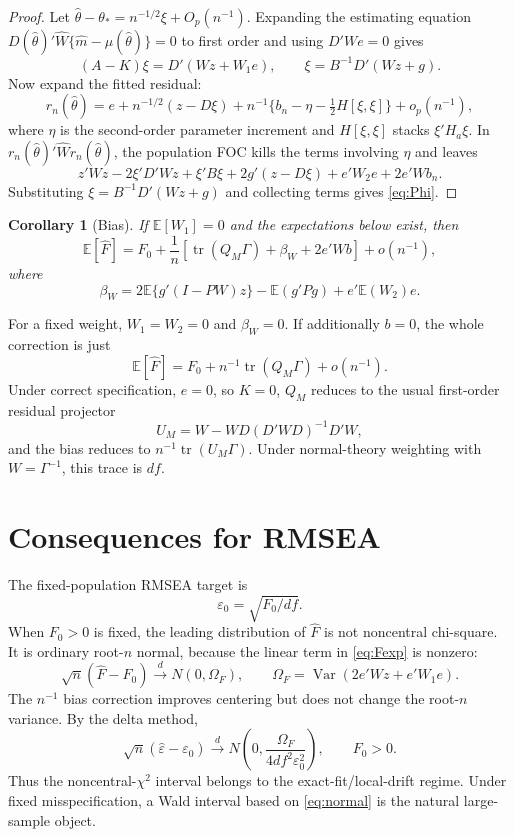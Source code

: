 \documentclass[11pt]{article}
\newcommand{\E}{\mathbb{E}}
\newcommand{\Var}{\operatorname{Var}}
\newcommand{\tr}{\operatorname{tr}}
\newcommand{\dto}{\xrightarrow{d}}
\theoremstyle{plain}
\newtheorem{corollary}{Corollary}
\theoremstyle{remark}
\begin{document}
\begin{proof}
Let $\hat\theta-\theta_\ast=n^{-1/2}\xi+O_p(n^{-1})$. Expanding the estimating
equation $D(\hat\theta)'\hat W\{\hat m-\mu(\hat\theta)\}=0$ to first order and
using $D'We=0$ gives
\[
  (A-K)\xi = D'(Wz+W_1e),
  \qquad
  \xi=B^{-1}D'(Wz+g).
\]
Now expand the fitted residual:
\[
  r_n(\hat\theta)
  =
  e+n^{-1/2}(z-D\xi)
  +n^{-1}\{b_n-\eta-\tfrac12 H[\xi,\xi]\}
  +o_p(n^{-1}),
\]
where $\eta$ is the second-order parameter increment and $H[\xi,\xi]$ stacks
$\xi'H_a\xi$. In $r_n(\hat\theta)'\hat W r_n(\hat\theta)$, the population FOC
kills the terms involving $\eta$ and leaves
\[
  z'Wz - 2\xi'D'Wz + \xi'B\xi
  + 2g'(z-D\xi)
  + e'W_2e
  + 2e'Wb_n .
\]
Substituting $\xi=B^{-1}D'(Wz+g)$ and collecting terms gives
\eqref{eq:Phi}.
\end{proof}

\begin{corollary}[Bias]\label{cor:bias}
If $\E[W_1]=0$ and the expectations below exist, then
\begin{equation}\label{eq:bias}
  \E[\hat F]
  =
  F_0
  + \frac{1}{n}
  \left[
    \tr(Q_M\Gamma)
    + \beta_W
    + 2e'Wb
  \right]
  + o(n^{-1}),
\end{equation}
where
\begin{equation}\label{eq:betaW}
  \beta_W
  =
  2\E\{g'(I-PW)z\}
  - \E(g'Pg)
  + e'\E(W_2)e .
\end{equation}
\end{corollary}

For a fixed weight, $W_1=W_2=0$ and $\beta_W=0$. If additionally $b=0$, the
whole correction is just
\[
  \E[\hat F]=F_0+n^{-1}\tr(Q_M\Gamma)+o(n^{-1}).
\]
Under correct specification, $e=0$, so $K=0$, $Q_M$ reduces to the
usual first-order residual projector
\[
  U_M = W-WD(D'WD)^{-1}D'W ,
\]
and the bias reduces to $n^{-1}\tr(U_M\Gamma)$. Under normal-theory weighting
with $W=\Gamma^{-1}$, this trace is $df$.

\section{Consequences for RMSEA}

The fixed-population RMSEA target is
\[
  \varepsilon_0 = \sqrt{F_0/df}.
\]
When $F_0>0$ is fixed, the leading distribution of $\hat F$ is not noncentral
chi-square. It is ordinary root-$n$ normal, because the linear term in
\eqref{eq:Fexp} is nonzero:
\begin{equation}\label{eq:normal}
  \sqrt n(\hat F-F_0)
  \dto
  N(0,\Omega_F),
  \qquad
  \Omega_F=\Var(2e'Wz+e'W_1e).
\end{equation}
The $n^{-1}$ bias correction improves centering but does not change the
root-$n$ variance. By the delta method,
\[
  \sqrt n(\hat\varepsilon-\varepsilon_0)
  \dto
  N\!\left(0,\frac{\Omega_F}{4df^2\varepsilon_0^2}\right),
  \qquad F_0>0 .
\]
Thus the noncentral-$\chi^2$ interval belongs to the exact-fit/local-drift
regime. Under fixed misspecification, a Wald interval based on
\eqref{eq:normal} is the natural large-sample object.
\end{document}
